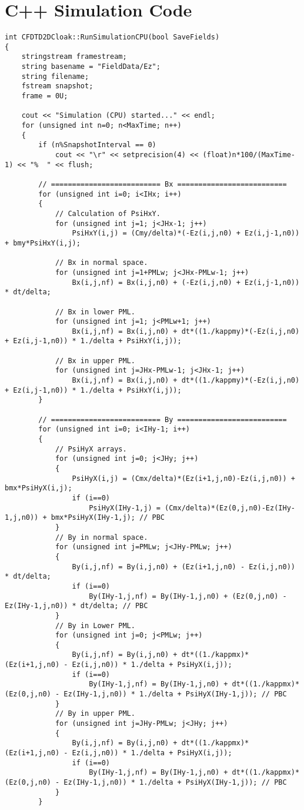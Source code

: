 \section{C++ Simulation Code}
\label{App:C++-Simulation-Cloak}
\begin{lstlisting}
int CFDTD2DCloak::RunSimulationCPU(bool SaveFields)
{
	stringstream framestream;
	string basename = "FieldData/Ez";
	string filename;
	fstream snapshot;
	frame = 0U;

	cout << "Simulation (CPU) started..." << endl;
	for (unsigned int n=0; n<MaxTime; n++)
	{
		if (n%SnapshotInterval == 0)
			cout << "\r" << setprecision(4) << (float)n*100/(MaxTime-1) << "%  " << flush;

		// ========================== Bx ==========================
		for (unsigned int i=0; i<IHx; i++)
		{
			// Calculation of PsiHxY.
			for (unsigned int j=1; j<JHx-1; j++)
				PsiHxY(i,j) = (Cmy/delta)*(-Ez(i,j,n0) + Ez(i,j-1,n0)) + bmy*PsiHxY(i,j);

			// Bx in normal space.
			for (unsigned int j=1+PMLw; j<JHx-PMLw-1; j++)
				Bx(i,j,nf) = Bx(i,j,n0) + (-Ez(i,j,n0) + Ez(i,j-1,n0)) * dt/delta;

			// Bx in lower PML.
			for (unsigned int j=1; j<PMLw+1; j++)
				Bx(i,j,nf) = Bx(i,j,n0) + dt*((1./kappmy)*(-Ez(i,j,n0) + Ez(i,j-1,n0)) * 1./delta + PsiHxY(i,j));

			// Bx in upper PML.
			for (unsigned int j=JHx-PMLw-1; j<JHx-1; j++)
				Bx(i,j,nf) = Bx(i,j,n0) + dt*((1./kappmy)*(-Ez(i,j,n0) + Ez(i,j-1,n0)) * 1./delta + PsiHxY(i,j));
		}

		// ========================== By ==========================
		for (unsigned int i=0; i<IHy-1; i++)
		{
			// PsiHyX arrays.
			for (unsigned int j=0; j<JHy; j++)
			{
				PsiHyX(i,j) = (Cmx/delta)*(Ez(i+1,j,n0)-Ez(i,j,n0)) + bmx*PsiHyX(i,j);
				if (i==0)
					PsiHyX(IHy-1,j) = (Cmx/delta)*(Ez(0,j,n0)-Ez(IHy-1,j,n0)) + bmx*PsiHyX(IHy-1,j); // PBC
			}
			// By in normal space.
			for (unsigned int j=PMLw; j<JHy-PMLw; j++)
			{
				By(i,j,nf) = By(i,j,n0) + (Ez(i+1,j,n0) - Ez(i,j,n0)) * dt/delta;
				if (i==0)
					By(IHy-1,j,nf) = By(IHy-1,j,n0) + (Ez(0,j,n0) - Ez(IHy-1,j,n0)) * dt/delta; // PBC
			}
			// By in Lower PML.
			for (unsigned int j=0; j<PMLw; j++)
			{
				By(i,j,nf) = By(i,j,n0) + dt*((1./kappmx)*(Ez(i+1,j,n0) - Ez(i,j,n0)) * 1./delta + PsiHyX(i,j));
				if (i==0)
					By(IHy-1,j,nf) = By(IHy-1,j,n0) + dt*((1./kappmx)*(Ez(0,j,n0) - Ez(IHy-1,j,n0)) * 1./delta + PsiHyX(IHy-1,j)); // PBC
			}
			// By in upper PML.
			for (unsigned int j=JHy-PMLw; j<JHy; j++)
			{
				By(i,j,nf) = By(i,j,n0) + dt*((1./kappmx)*(Ez(i+1,j,n0) - Ez(i,j,n0)) * 1./delta + PsiHyX(i,j));
				if (i==0)
					By(IHy-1,j,nf) = By(IHy-1,j,n0) + dt*((1./kappmx)*(Ez(0,j,n0) - Ez(IHy-1,j,n0)) * 1./delta + PsiHyX(IHy-1,j)); // PBC
			}
		}


\end{lstlisting}

